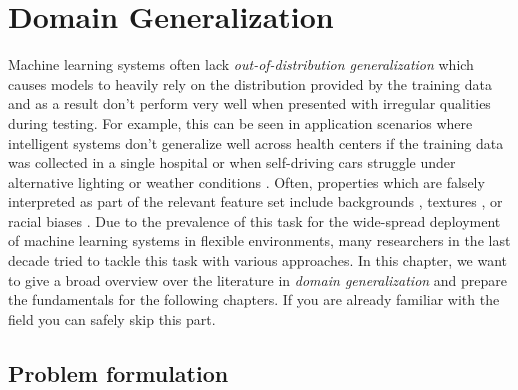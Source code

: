 \chapter{Domain Generalization} %
\label{DomainGeneralization} 

Machine learning systems often lack \emph{out-of-distribution generalization} which causes models to heavily rely on the distribution provided by the training data and as a result don't perform very well when presented with irregular qualities during testing. For example, this can be seen in application scenarios where intelligent systems don't generalize well across health centers if the training data was collected in a single hospital \citep{Castro_2020, AlBadawy2018, PeroneBBC19} or when self-driving cars struggle under alternative lighting or weather conditions \citep{DaiG18, VolkMBH019}. Often, properties which are falsely interpreted as part of the relevant feature set include backgrounds \citep{BeeryHP18}, textures \citep{GeirhosRMBWB19}, or racial biases \citep{StockC18}. Due to the prevalence of this task for the wide-spread deployment of machine learning systems in flexible environments, many researchers in the last decade tried to tackle this task with various approaches. In this chapter, we want to give a broad overview over the literature in \emph{domain generalization} and prepare the fundamentals for the following chapters. If you are already familiar with the field you can safely skip this part.

\section{Problem formulation}
\label{sec:domain_gen_problem}

